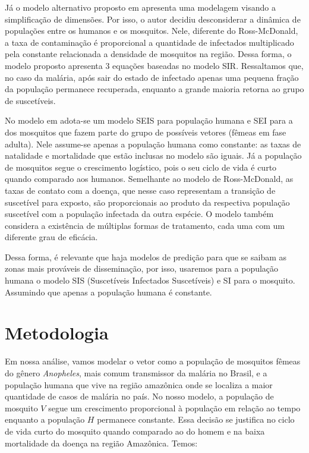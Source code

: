 \documentclass[
	12pt,				%
	openright,			%
	twoside,			%
	a4paper,			%
	english,			%
	french,				%
	spanish,			%
	brazil				%
	]{abntex2}
\begin{document}
Já o modelo alternativo proposto em \cite{macufa} apresenta uma modelagem visando a simplificação de dimensões. Por isso, o autor decidiu desconsiderar a dinâmica de populações entre os humanos e os mosquitos. Nele, diferente do Ross-McDonald, a taxa de contaminação é proporcional a quantidade de infectados multiplicado pela constante relacionada a densidade de mosquitos na região. Dessa forma, o modelo proposto apresenta 3 equações baseadas no modelo SIR. Ressaltamos que, no caso da malária, após sair do estado de infectado apenas uma pequena fração da população permanece recuperada, enquanto a grande maioria retorna ao grupo de suscetíveis.


No modelo em \cite{wyse2006modelo} adota-se um modelo SEIS para população humana e SEI para a dos mosquitos que fazem parte do grupo de possíveis vetores (fêmeas em fase adulta). Nele assume-se apenas a população humana como constante: as taxas de natalidade e mortalidade que estão inclusas no modelo são iguais. Já a população de mosquitos segue o crescimento logístico, pois o seu ciclo de vida é curto quando comparado aos humanos. Semelhante ao modelo de Ross-McDonald, as taxas de contato com a doença, que nesse caso representam a transição de suscetível para exposto, são proporcionais ao produto da respectiva população suscetível com a população infectada da outra espécie. O modelo também considera a existência de múltiplas formas de tratamento, cada uma com um diferente grau de eficácia.

Dessa forma, é relevante que haja modelos de predição para que se saibam as zonas mais prováveis de disseminação, por isso, usaremos para a população humana o modelo SIS (Suscetíveis Infectados Suscetíveis) e SI para o mosquito. Assumindo que apenas a população humana é constante. 



\chapter*[Metodologia]{Metodologia}

Em nossa análise, vamos modelar o vetor como a população de mosquitos fêmeas do gênero \textit{Anopheles}, mais comum transmissor da malária no Brasil, e a população humana que vive na região amazônica onde se localiza a maior quantidade de casos de malária no país. No nosso modelo, a população de mosquito $V$ segue um crescimento proporcional à população em relação ao tempo enquanto a população $H$ permanece constante. Essa decisão se justifica no ciclo de vida curto do mosquito quando comparado ao do homem e na baixa mortalidade da doença na região Amazônica. Temos:
\end{document}
